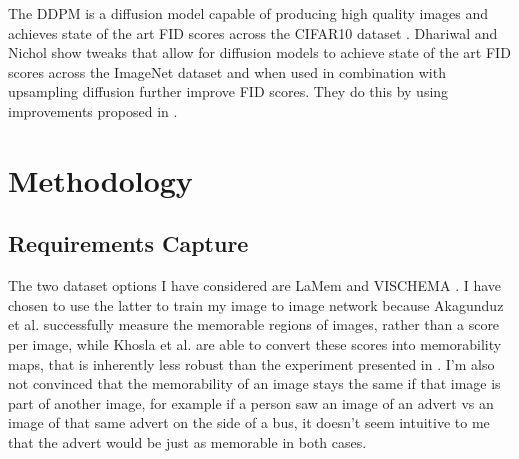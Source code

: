 \documentclass{UoYCSproject}
\begin{document}
The DDPM is a diffusion model capable of producing high quality images and achieves state of the art FID scores across the CIFAR10 dataset \cite{ho2020denoising}. Dhariwal and Nichol \cite{dhariwal2021diffusion} show tweaks that allow for diffusion models to achieve state of the art FID scores across the ImageNet dataset and when used in combination with upsampling diffusion further improve FID scores. They do this by using improvements proposed in \cite{song2022denoising, nichol2021improved, song2021scorebased, brock2019large, karras2019stylebased}. 



\chapter{Methodology}



\section{Requirements Capture}

The two dataset options I have considered are LaMem \cite{ICCV15_Khosla} and VISCHEMA \cite{VischemaPaper}. I have chosen to use the latter to train my image to image network because Akagunduz et al. successfully measure the memorable regions of images, rather than a score per image, while Khosla et al. are able to convert these scores into memorability maps, that is inherently less robust than the experiment presented in \cite{VischemaPaper}. I'm also not convinced that the memorability of an image stays the same if that image is part of another image, for example if a person saw an image of an advert vs an image of that same advert on the side of a bus, it doesn't seem intuitive to me that the advert would be just as memorable in both cases.   
\end{document}
